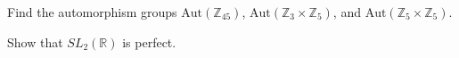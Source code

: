 \documentclass{article}
\newcounter{Problem}
\newenvironment{Problem}{\begin{Exercise}[name={Problem},
                                          counter={Problem}]}
                        {\end{Exercise}}
\begin{document}
\pagebreak

\begin{Problem}
Find the automorphism groups $\mathrm{Aut}(\mathbb{Z}_{45})$,
$\mathrm{Aut}(\mathbb{Z}_3 \times \mathbb{Z}_5)$, and
$\mathrm{Aut}(\mathbb{Z}_5 \times \mathbb{Z}_5)$.
\end{Problem}

\begin{Answer}

\end{Answer}

\pagebreak

\begin{Problem}
Show that $SL_2(\mathbb{R})$ is perfect.
\end{Problem}

\begin{Answer}


\end{Answer}
\end{document}
